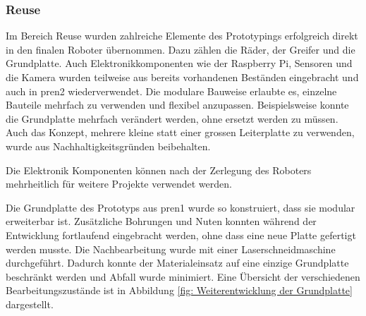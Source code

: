 \subsubsection{Reuse}

Im Bereich Reuse wurden zahlreiche Elemente des Prototypings erfolgreich direkt in den finalen Roboter übernommen. Dazu zählen die Räder, der Greifer und die Grundplatte. Auch Elektronikkomponenten wie der Raspberry Pi, Sensoren und die Kamera wurden teilweise aus bereits vorhandenen Beständen eingebracht und auch in \acrshort{pren2} wiederverwendet. Die modulare Bauweise erlaubte es, einzelne Bauteile mehrfach zu verwenden und flexibel anzupassen. Beispielsweise konnte die Grundplatte mehrfach verändert werden, ohne ersetzt werden zu müssen. Auch das Konzept, mehrere kleine statt einer grossen Leiterplatte zu verwenden, wurde aus Nachhaltigkeitsgründen beibehalten.

Die Elektronik Komponenten können nach der Zerlegung des Roboters mehrheitlich für weitere Projekte verwendet werden.

Die Grundplatte des Prototyps aus \acrshort{pren1} wurde so konstruiert, dass sie modular erweiterbar ist. Zusätzliche Bohrungen und Nuten konnten während der Entwicklung fortlaufend eingebracht werden, ohne dass eine neue Platte gefertigt werden musste. Die Nachbearbeitung wurde mit einer Laserschneidmaschine durchgeführt. Dadurch konnte der Materialeinsatz auf eine einzige Grundplatte beschränkt werden und Abfall wurde minimiert. Eine Übersicht der verschiedenen Bearbeitungszustände ist in Abbildung \ref{fig: Weiterentwicklung der Grundplatte} dargestellt.

